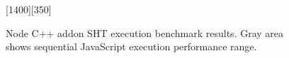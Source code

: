 

\begin{figure}
     {

        \seqReferenceLookup
    }[1400][350]
    \label{plot:cpu-addon}
    \caption{Node C++ addon SHT execution benchmark results. Gray area shows sequential JavaScript execution performance range.}
\end{figure}
